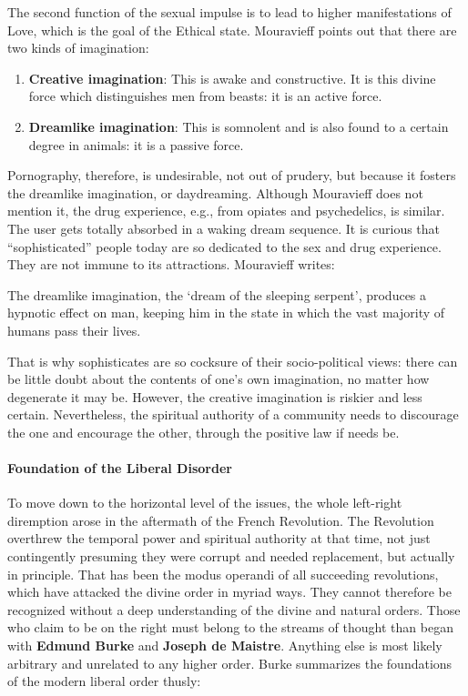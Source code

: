 The second function of the sexual impulse is to lead to higher manifestations of Love, which is the goal of the Ethical state. Mouravieff points out that there are two kinds of imagination:

\begin{enumerate}


\item \textbf{Creative imagination}: This is awake and constructive. It is this divine force which distinguishes men from beasts: it is an active force.

\item \textbf{Dreamlike imagination}: This is somnolent and is also found to a certain degree in animals: it is a passive force.
\end{enumerate}


Pornography, therefore, is undesirable, not out of prudery, but because it fosters the dreamlike imagination, or daydreaming. Although Mouravieff does not mention it, the drug experience, e.g., from opiates and psychedelics, is similar. The user gets totally absorbed in a waking dream sequence. It is curious that ``sophisticated'' people today are so dedicated to the sex and drug experience. They are not immune to its attractions. Mouravieff writes:

\begin{quotex}
The dreamlike imagination, the `dream of the sleeping serpent', produces a hypnotic effect on man, keeping him in the state in which the vast majority of humans pass their lives.
\end{quotex}


That is why sophisticates are so cocksure of their socio-political views: there can be little doubt about the contents of one's own imagination, no matter how degenerate it may be. However, the creative imagination is riskier and less certain. Nevertheless, the spiritual authority of a community needs to discourage the one and encourage the other, through the positive law if needs be.

\paragraph{Foundation of the Liberal Disorder}


To move down to the horizontal level of the issues, the whole left-right diremption arose in the aftermath of the French Revolution. The Revolution overthrew the temporal power and spiritual authority at that time, not just contingently presuming they were corrupt and needed replacement, but actually in principle. That has been the modus operandi of all succeeding revolutions, which have attacked the divine order in myriad ways. They cannot therefore be recognized without a deep understanding of the divine and natural orders. Those who claim to be on the right must belong to the streams of thought than began with \textbf{Edmund Burke} and \textbf{Joseph de Maistre}. Anything else is most likely arbitrary and unrelated to any higher order. Burke summarizes the foundations of the modern liberal order thusly:

